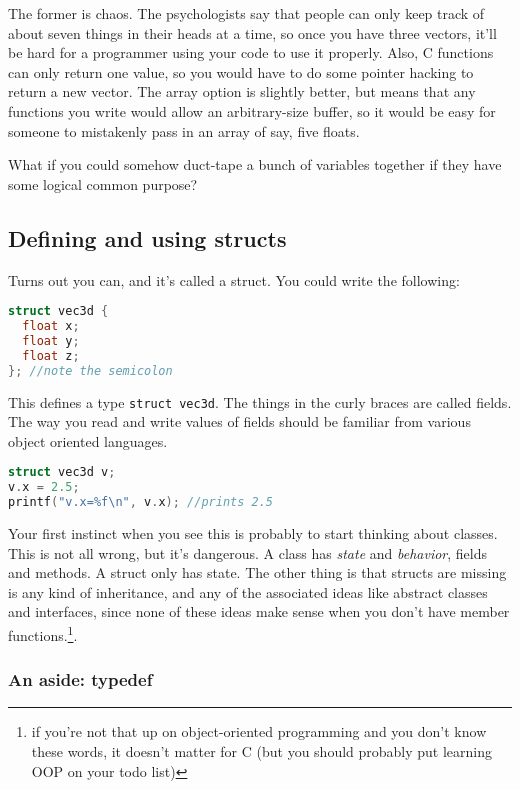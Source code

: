 \documentclass[ebook,11pt,oneside,openany]{memoir}
\begin{document}
The former is chaos. The psychologists say that people can only keep track of about seven things in their heads at a time, so once you have three vectors, it'll be hard for a programmer using your code to use it properly. Also, C functions can  only return one value, so you would have to do some pointer hacking to return a new vector. The array option is slightly better, but means that any functions you write would allow an arbitrary-size buffer, so it would be easy for someone to mistakenly pass in an array of say, five floats.

What if you could somehow duct-tape a bunch of variables together if they have some logical common purpose?

\subsection{Defining and using structs}
Turns out you can, and it's called a struct. You could write the following: 

\begin{lstlisting}[language=C]
struct vec3d {
  float x;
  float y;
  float z;
}; //note the semicolon
\end{lstlisting}

This defines a type \texttt{struct vec3d}. The things in the curly braces are called fields. The way you read and write values of fields should be familiar from various object oriented languages.

\begin{lstlisting}[language=C]
struct vec3d v;
v.x = 2.5;
printf("v.x=%f\n", v.x); //prints 2.5
\end{lstlisting}

Your first instinct when you see this is probably to start thinking about classes. This is not all wrong, but it's dangerous. A class has \textit{state} and \textit{behavior}, fields and methods. A struct only has state. The other thing is that structs are missing is any kind of inheritance, and any of the associated ideas like abstract classes and interfaces, since none of these ideas make sense when you don't have member functions.\footnote{if you're not that up on object-oriented programming and you don't know these words, it doesn't matter for C (but you should probably put learning OOP on your todo list)}.

\subsubsection{An aside: typedef}
\end{document}
